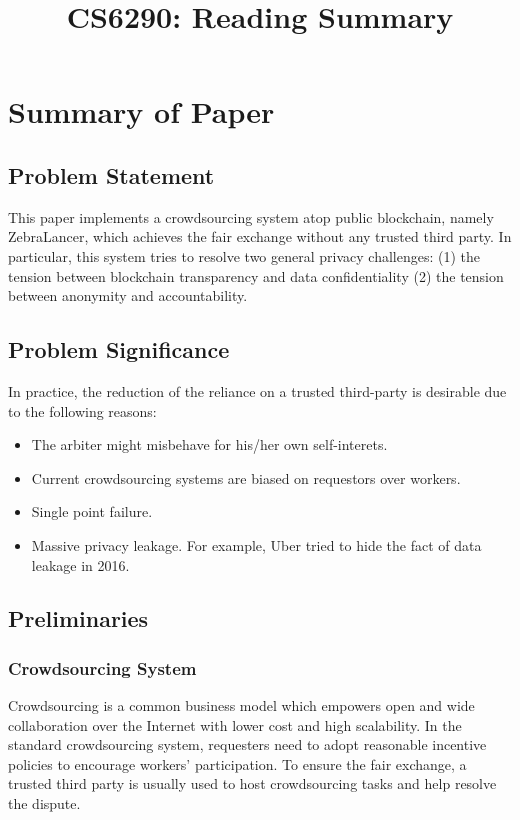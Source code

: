 \documentclass[conference]{IEEEtran}
\begin{document}
\title{CS6290: Reading Summary }

\author{
}

\maketitle

\section{Summary of Paper \cite{lu2018zebralancer}}

\subsection{Problem Statement}
This paper implements a crowdsourcing system atop public blockchain, namely ZebraLancer, which achieves the fair exchange without any trusted third party.
%
In particular, this system tries to resolve two general privacy challenges: (1) the tension between blockchain transparency and data confidentiality (2) the tension between anonymity and accountability. 

\subsection{Problem Significance}
In practice, the reduction of the reliance on a trusted third-party is desirable due to the following reasons:
%
\begin{itemize}
    \item The arbiter might misbehave for his/her own self-interets. 
    \item Current crowdsourcing systems are biased on requestors over workers.
    \item Single point failure.
    \item Massive privacy leakage. For example, Uber tried to hide the fact of data leakage in 2016.  
\end{itemize}
 
\subsection{Preliminaries}
\subsubsection{Crowdsourcing System}
Crowdsourcing is a common business model which empowers open and wide collaboration over the Internet with lower cost and high scalability.
%
In the standard crowdsourcing system, requesters need to adopt reasonable incentive policies to encourage workers' participation.
%
To ensure the fair exchange, a trusted third party is usually used to host crowdsourcing tasks and help resolve the dispute.
%
\end{document}
